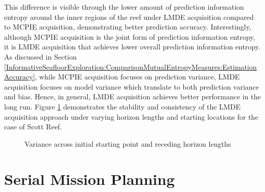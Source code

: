 			This difference is visible through the lower amount of prediction information entropy around the inner regions of the reef under LMDE acquisition compared to MCPIE acquisition, demonstrating better prediction accuracy. Interestingly, although MCPIE acquisition is the joint form of prediction information entropy, it is LMDE acquisition that achieves lower overall prediction information entropy. As discussed in Section \ref{InformativeSeafloorExploration:ComparisonMutualEntropyMeasures:EstimationAccuracy}, while MCPIE acquisition focuses on prediction variance, LMDE acquisition focuses on model variance which translate to both prediction variance and bias. Hence, in general, LMDE acquisition achieves better performance in the long run. Figure \ref{Figure:VarianceSimulation} demonstrates the stability and consistency of the LMDE acquisition approach under varying horizon lengths and starting locations for the case of Scott Reef. 

			\begin{figure}[t]
			\centering
			\caption{Variance across initial starting point and receding horizon lengths}
			\label{Figure:VarianceSimulation}
			\end{figure}
			
	\section{Serial Mission Planning}
	\label{Appendix:SeafloorExplorationTimeLapse:Serial}
	
